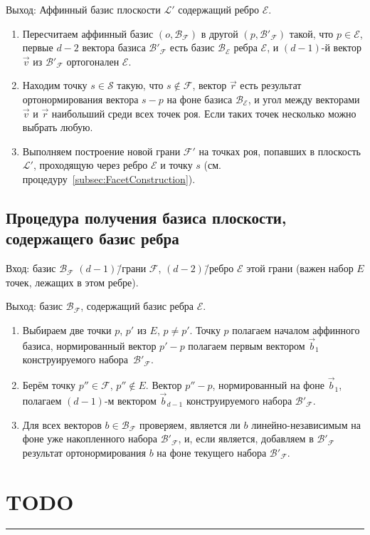 \documentclass[a4paper,12pt]{article}
\newcommand{\Swarm}{\mathcal{S}}              %
\newcommand{\Facet}{\mathcal{F}}              %
\newcommand{\Edge}{\mathcal{E}}               %
\newcommand{\Basis}{\mathcal{B}}              %
\newcommand{\Plane}{\mathcal{L}}           %
\renewcommand{\.}{\hspace{0.2ex}}
\begin{document}
    Выход: Аффинный базис плоскости $\Plane'$ содержащий ребро $\Edge$.

    \begin{enumerate}
      \item Пересчитаем аффинный базис $(o, \Basis_{\Facet})$ в другой $(p, \Basis'_{\Facet})$ такой, что $p \in \Edge$, первые $d-2$ вектора базиса $\Basis'_{\Facet}$ есть базис $\Basis_{\Edge}$ ребра $\Edge$, и $(d-1)$-й вектор $\vec v$ из $\Basis'_{\Facet}$ ортогонален $\Edge$.
      \item Находим точку $s \in \Swarm$ такую, что $s \notin \Facet$, вектор $\vec r$ есть результат ортонормирования вектора $s - p$ на фоне базиса $\Basis_{\Edge}$, и угол между векторами $\vec v$ и $\vec r$ наибольший среди всех точек роя. Если таких точек несколько можно выбрать любую.
      \item Выполняем построение новой грани $\Facet'$ на точках роя, попавших в плоскость $\Plane'$, проходящую через ребро $\Edge$ и точку $s$ (см. процедуру~\ref{subsec:FacetConstruction}).
    \end{enumerate}

  \subsection{Процедура получения базиса плоскости, содержащего базис ребра}
    Вход: базис $\Basis_{\Facet}$ $(d-1)$\=/грани $\Facet$, $(d-2)$\=/ребро $\Edge$ этой грани (важен набор $E$ точек, лежащих в этом ребре).

    Выход: базис $\Basis_{\Facet}$, содержащий базис ребра $\Edge$.
    \begin{enumerate}
      \item Выбираем две точки $p$, $p'$ из $E$, $p \neq p'$. Точку $p$ полагаем началом аффинного базиса, нормированный вектор $p'-p$ полагаем первым вектором $\vec b_1$ конструируемого набора~$\Basis'_{\Facet}$.
      \item Берём точку $p'' \in \Facet$, $p'' \notin E$. Вектор $p''-p$, нормированный на фоне $\vec b_1$, полагаем $(d-1)$-м вектором $\vec b_{d-1}$ конструируемого набора $\Basis'_{\Facet}$.
      \item Для всех векторов $b \in \Basis_{\Facet}$ проверяем, является ли $b$ линейно-независимым на фоне уже накопленного набора $\Basis'_{\Facet}$, и, если является, добавляем в $\Basis'_{\Facet}$ результат ортонормирования $b$ на фоне текущего набора $\Basis'_{\Facet}$.
    \end{enumerate}


\section{TODO}

  \hrule
\end{document}
